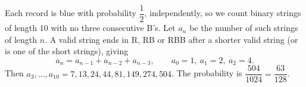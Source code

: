 Each record is blue with probability $\dfrac{1}{2}$, independently, so we count binary strings of length $10$ with no three consecutive B's. Let $a_n$ be the number of such strings of length $n$. A valid string ends in R, RB or RBB after a shorter valid string (or is one of the short strings), giving
\[a_n=a_{n-1}+a_{n-2}+a_{n-3},\qquad a_0=1,\ a_1=2,\ a_2=4.\]
Then $a_3,\dots,a_{10}=7,13,24,44,81,149,274,504$. The probability is $\dfrac{504}{1024}=\boxed{\dfrac{63}{128}}$.
